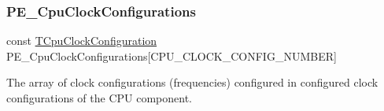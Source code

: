 \subsubsection{\texorpdfstring{P\+E\+\_\+\+Cpu\+Clock\+Configurations}{PE\_CpuClockConfigurations}}
{\footnotesize\ttfamily const \hyperlink{struct_t_cpu_clock_configuration}{T\+Cpu\+Clock\+Configuration} P\+E\+\_\+\+Cpu\+Clock\+Configurations\mbox{[}C\+P\+U\+\_\+\+C\+L\+O\+C\+K\+\_\+\+C\+O\+N\+F\+I\+G\+\_\+\+N\+U\+M\+B\+ER\mbox{]}}

The array of clock configurations (frequencies) configured in configured clock configurations of the C\+PU component. 